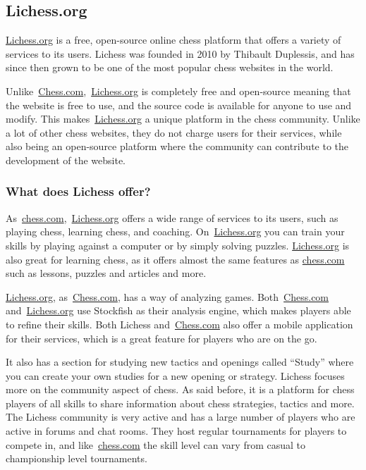 \subsection{Lichess.org}\label{subsec:lichess-org}

\url{Lichess.org} is a free, open-source online chess platform that offers a variety of services to its users.
Lichess was founded in 2010 by Thibault Duplessis, and has since then grown to be one of the most popular chess websites
in the world.

Unlike~\url{Chess.com},~\url{Lichess.org} is completely free and open-source meaning that the website is free to use,
and the source
code is available for anyone to use and modify.
This makes~\url{Lichess.org} a unique platform in the chess community.
Unlike a lot of other chess websites, they do not charge users for their services, while also being an open-source
platform where the community can contribute to the development of the website.

\subsubsection{What does Lichess offer?}\label{subsubsec:what-does-lichess-offer}

As~\url{chess.com},~\url{Lichess.org} offers a wide range of services to its users, such as playing chess,
learning chess, and coaching.
On~\url{Lichess.org} you can train your skills by playing against a computer or by simply solving puzzles.
\url{Lichess.org} is also great for learning chess, as it offers almost the same features as \url{chess.com}
such as lessons, puzzles and articles and more.

\url{Lichess.org}, as~\url{Chess.com}, has a way of analyzing games.
Both~\url{Chess.com} and~\url{Lichess.org} use Stockfish as their analysis engine, which makes players able to
refine their skills.
Both Lichess and~\url{Chess.com} also offer a mobile application for their services, which is a great feature for
players who are on the go.

It also has a section for studying new tactics and openings called “Study” where you can create your own studies for
a new opening or strategy.
Lichess focuses more on the community aspect of chess.
As said before, it is a platform for chess players of all skills to share information about chess strategies,
tactics and more.
The Lichess community is very active and has a large number of players who are active in forums and chat rooms.
They host regular tournaments for players to compete in, and like~\url{chess.com} the skill level can vary
from casual to championship level tournaments.
